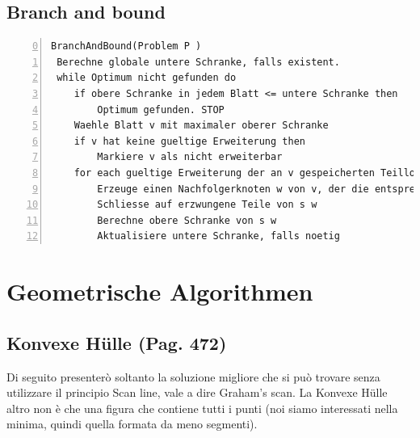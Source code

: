 \documentclass[a4paper]{book}
\newcommand{\lstIndent}{4}
\begin{document}
\section{Branch and bound}
\begin{lstlisting}[tabsize=\lstIndent,numbers=left,numberstyle=\tiny, firstnumber=0]
BranchAndBound(Problem P )
 Berechne globale untere Schranke, falls existent.
 while Optimum nicht gefunden do
 	if obere Schranke in jedem Blatt <= untere Schranke then
		Optimum gefunden. STOP
	Waehle Blatt v mit maximaler oberer Schranke
	if v hat keine gueltige Erweiterung then
		Markiere v als nicht erweiterbar
	for each gueltige Erweiterung der an v gespeicherten Teilloesung do
		Erzeuge einen Nachfolgerknoten w von v, der die entsprechend erweiterte Teilloesung s w speichert
 		Schliesse auf erzwungene Teile von s w
		Berechne obere Schranke von s w
		Aktualisiere untere Schranke, falls noetig
\end{lstlisting}

\chapter{Geometrische Algorithmen}
\section{Konvexe Hülle (Pag. 472)}
Di seguito presenterò soltanto la soluzione migliore che si può trovare senza utilizzare il principio Scan line, vale a dire Graham's scan. La Konvexe Hülle altro non è che una figura che contiene tutti i punti (noi siamo interessati nella minima, quindi quella formata da meno segmenti).
\end{document}
